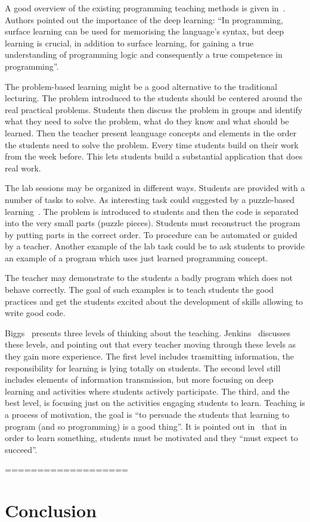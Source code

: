 \documentclass{article}
\begin{document}
A good overview of the existing programming teaching methods is given
in~\cite{mohorovivcic2011overview}. Authors pointed out the importance
of the deep learning: ``In programming, surface learning can be used
for memorising the language’s syntax, but deep learning is crucial, in
addition to surface learning, for gaining a true understanding of
programming logic and consequently a true competence in
programming''.

The problem-based learning might be a good alternative to the
traditional lecturing.  The problem introduced to the students should
be centered around the real practical problems. Students then discuss
the problem in groups and identify what they need to solve the
problem, what do they know and what should be learned. Then the
teacher present leanguage concepts and elements in the order the
students need to solve the problem. Every time students build
on their work from the week before. This lets students build a
substantial application that does real work.


The lab sessions may be organized in different ways. Students are
provided with a number of tasks to solve. As interesting task could
suggested by a puzzle-based
learning~\cite{mohorovivcic2011overview}. The problem is introduced to
students and then the code is separated into the very small parts
(puzzle pieces). Students must reconstruct the program by putting
parts in the correct order. To procedure can be automated or guided by
a teacher. Another example of the lab task could be to ask students to
provide an example of a program which uses just learned programming
concept.


The teacher may demonstrate to the students a badly program which does
not behave correctly. The goal of such examples is to teach students
the good practices and get the students excited about the development
of skills allowing to write good code.


Biggs~\cite{biggs2011teaching} presents three levels of thinking about
the teaching.  Jenkins~\cite{journey_Jenkins} discusses these levels,
and pointing out that every teacher moving through these levels as
they gain more experience. The first level includes trasmitting
information, the responsibility for learning is lying totally on
students. The second level still includes elements of information
transmission, but more focusing on deep learning and activities where
students actively participate.  The third, and the best level, is
focusing just on the activities engaging students to learn. Teaching
is a process of motivation, the goal is ``to persuade the students
that learning to program (and so programming) is a good thing''. It is
pointed out in~\cite{journey_Jenkins} that in order to learn
something, students must be motivated and they ``must expect to
succeed''.






===================










\section{Conclusion} %
\label{sec:conclusion}




\end{document}
